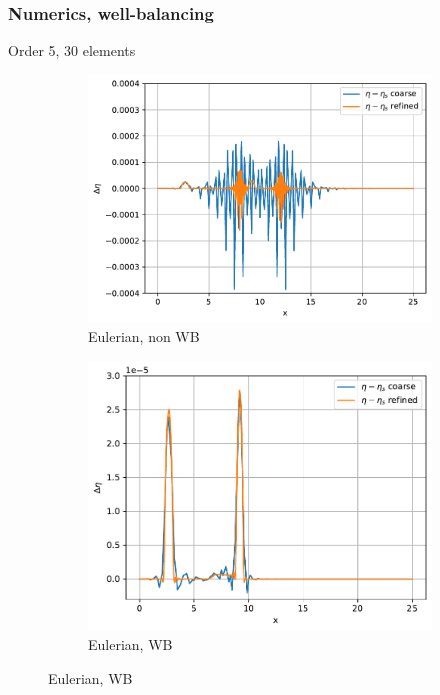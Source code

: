 \documentclass[pt12]{beamer}
\begin{document}
\begin{frame}
\frametitle{Numerics, well-balancing}
\centering

Order 5, 30 elements

\begin{figure}
     \centering
     \begin{subfigure}[b]{0.3\textwidth}
         \centering
         \includegraphics[width=\textwidth]{figures/lakeatrest/eul_nonWB.pdf}
         \caption{Eulerian, non WB}
     \end{subfigure}
     \begin{subfigure}[b]{0.3\textwidth}
         \centering
         \includegraphics[width=\textwidth]{figures/lakeatrest/eul.pdf}
     \caption{Eulerian, WB}

\end{subfigure}
\end{figure}
\end{frame}
\end{document}
